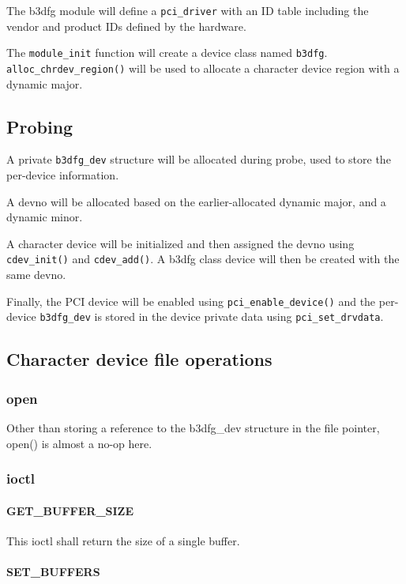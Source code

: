\documentclass[12pt]{article}
\begin{document}
The b3dfg module will define a \texttt{pci\_driver} with an ID table including the vendor and product IDs defined by the hardware.

The \texttt{module\_init} function will create a device class named \texttt{b3dfg}. \texttt{alloc\_chrdev\_region()} will be used to allocate a character device region with a dynamic major.

\subsection{Probing}

A private \texttt{b3dfg\_dev} structure will be allocated during probe, used to store the per-device information.

A devno will be allocated based on the earlier-allocated dynamic major, and a dynamic minor.

A character device will be initialized and then assigned the devno using \texttt{cdev\_init()} and \texttt{cdev\_add()}. A b3dfg class device will then be created with the same devno.

Finally, the PCI device will be enabled using \texttt{pci\_enable\_device()} and the per-device \texttt{b3dfg\_dev} is stored in the device private data using \texttt{pci\_set\_drvdata}.

\subsection{Character device file operations}

\subsubsection{open}

Other than storing a reference to the b3dfg\_dev structure in the file pointer, open() is almost a no-op here.

\subsubsection{ioctl}

\paragraph{GET\_BUFFER\_SIZE}

This ioctl shall return the size of a single buffer.

\paragraph{SET\_BUFFERS}
\end{document}
